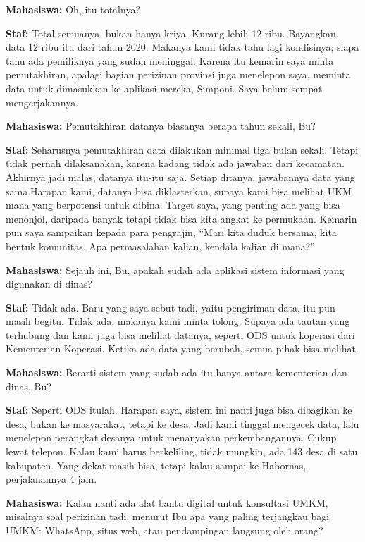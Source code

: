 {\noindent \textbf{Mahasiswa:} Oh, itu totalnya?

\noindent \textbf{Staf:} Total semuanya, bukan hanya kriya. Kurang lebih 12 ribu. Bayangkan, data 12 ribu itu dari tahun 2020. Makanya kami tidak tahu lagi kondisinya; siapa tahu ada pemiliknya yang sudah meninggal. Karena itu kemarin saya minta pemutakhiran, apalagi bagian perizinan provinsi juga menelepon saya, meminta data untuk dimasukkan ke aplikasi mereka, Simponi. Saya belum sempat mengerjakannya.

\noindent \textbf{Mahasiswa:} Pemutakhiran datanya biasanya berapa tahun sekali, Bu?

\noindent \textbf{Staf:} Seharusnya pemutakhiran data dilakukan minimal tiga bulan sekali. Tetapi tidak pernah dilaksanakan, karena kadang tidak ada jawaban dari kecamatan. Akhirnya jadi malas, datanya itu-itu saja. Setiap ditanya, jawabannya data yang sama.Harapan kami, datanya bisa diklasterkan, supaya kami bisa melihat UKM mana yang berpotensi untuk dibina. Target saya, yang penting ada yang bisa menonjol, daripada banyak tetapi tidak bisa kita angkat ke permukaan. Kemarin pun saya sampaikan kepada para pengrajin, ``Mari kita duduk bersama, kita bentuk komunitas. Apa permasalahan kalian, kendala kalian di mana?''

\noindent \textbf{Mahasiswa:} Sejauh ini, Bu, apakah sudah ada aplikasi sistem informasi yang digunakan di dinas?

\noindent \textbf{Staf:} Tidak ada. Baru yang saya sebut tadi, yaitu pengiriman data, itu pun masih begitu. Tidak ada, makanya kami minta tolong. Supaya ada tautan yang terhubung dan kami juga bisa melihat datanya, seperti ODS untuk koperasi dari Kementerian Koperasi. Ketika ada data yang berubah, semua pihak bisa melihat.

\noindent \textbf{Mahasiswa:} Berarti sistem yang sudah ada itu hanya antara kementerian dan dinas, Bu?

\noindent \textbf{Staf:} Seperti ODS itulah. Harapan saya, sistem ini nanti juga bisa dibagikan ke desa, bukan ke masyarakat, tetapi ke desa. Jadi kami tinggal mengecek data, lalu menelepon perangkat desanya untuk menanyakan perkembangannya. Cukup lewat telepon. Kalau kami harus berkeliling, tidak mungkin, ada 143 desa di satu kabupaten. Yang dekat masih bisa, tetapi kalau sampai ke Habornas, perjalanannya 4 jam.

\noindent \textbf{Mahasiswa:} Kalau nanti ada alat bantu digital untuk konsultasi UMKM, misalnya soal perizinan tadi, menurut Ibu apa yang paling terjangkau bagi UMKM: WhatsApp, situs web, atau pendampingan langsung oleh orang?

}
